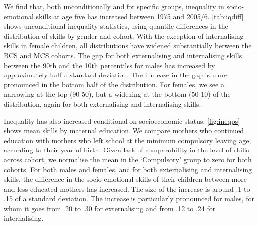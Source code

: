 We find that, both unconditionally and for specific groups, inequality in socio-emotional skills at age five has increased between 1975 and 2005/6. \autoref{tab:iqdiff} shows unconditional inequality statistics, using quantile differences in the distribution of skills by gender and cohort. With the exception of internalising skills in female children, all distributions have widened substantially between the BCS and MCS cohorts. The gap for both externalising and internalising skills between the 90th and the 10th percentiles for males has increased by approximately half a standard deviation. The increase in the gap is more pronounced in the bottom half of the distribution. For females, we see a narrowing at the top (90-50), but a widening at the bottom (50-10) of the distribution, again for both externalising and internalising skills.

Inequality has also increased conditional on socioeconomic status. \autoref{fig:ineqps} shows mean skills by maternal education. We compare mothers who continued education with mothers who left school at the minimum compulsory leaving age, according to their year of birth. Given lack of comparability in the level of skills across cohort, we normalise the mean in the `Compulsory' group to zero for both cohorts. For both males and females, and for both externalising and internalising skills, the difference in the socio-emotional skills of their children between more and less educated mothers has increased. The size of the increase is around .1 to .15 of a standard deviation. The increase is particularly pronounced for males, for whom it goes from .20 to .30 for externalising and from .12 to .24 for internalising.

